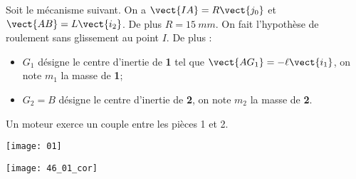 \normalfalse \difficiletrue \tdifficilefalse
\correctiontrue


\setcounter{question}{0}%
\ifcorrection
\else
{}
\fi

\ifprof
\else
Soit le mécanisme suivant. On a $\vect{IA}=R\vect{j_0}$ et $\vect{AB}=L\vect{i_2}$. De plus $R=\SI{15}{mm}$.
On fait l'hypothèse de roulement sans glissement au point $I$. De plus :
\begin{itemize}
\item $G_1$ désigne le centre d'inertie de \textbf{1} tel que $\vect{AG_1}=-\ell\vect{i_1}$, on note $m_1$ la masse de \textbf{1};%
\item $G_2=B$ désigne le centre d'inertie de \textbf{2}, on note $m_2$ la masse de \textbf{2}.%
\end{itemize}
Un moteur exerce un couple entre les pièces 1 et 2. 
\begin{marginfigure}
\texttt{[image: 01]}
\end{marginfigure}
\fi

\ifprof
\begin{marginfigure}
\texttt{[image: 46\_01\_cor]}
\end{marginfigure}

\else
\fi

\ifprof

